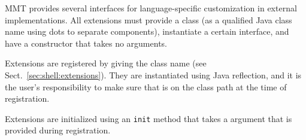 MMT provides several interfaces for language-specific customization in external implementations. All extensions must provide a class  (as a qualified Java class name using dots to separate components), instantiate a certain interface, and have a constructor that takes no arguments.

Extensions are registered by giving the class name  (see Sect.~\ref{sec:shell:extensions}). They are instantiated using Java reflection, and it is the user's responsibility to make sure that  is on the class path at the time of registration.

Extensions are initialized using an \texttt{init} method that takes a  argument that is provided during registration.


